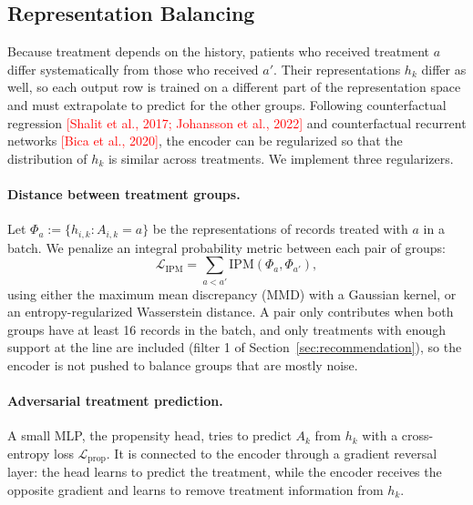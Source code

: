 \documentclass[a4paper,10pt]{article}
\newcommand{\todo}[1]{\textcolor{red}{#1}}
\begin{document}
\subsection{Representation Balancing}
\label{sec:balancing}

Because treatment depends on the history, patients who received treatment $a$ differ systematically from those who received $a'$. Their representations $h_k$ differ as well, so each output row is trained on a different part of the representation space and must extrapolate to predict for the other groups. Following counterfactual regression \todo{[Shalit et al., 2017; Johansson et al., 2022]} and counterfactual recurrent networks \todo{[Bica et al., 2020]}, the encoder can be regularized so that the distribution of $h_k$ is similar across treatments. We implement three regularizers.

\paragraph{Distance between treatment groups.} Let $\Phi_a := \{h_{i,k} : A_{i,k} = a\}$ be the representations of records treated with $a$ in a batch. We penalize an integral probability metric between each pair of groups:
\begin{equation}
    \mathcal{L}_{\text{IPM}} = \sum_{a < a'} \text{IPM}(\Phi_a, \Phi_{a'}),
\end{equation}
using either the maximum mean discrepancy (MMD) with a Gaussian kernel, or an entropy-regularized Wasserstein distance. A pair only contributes when both groups have at least 16 records in the batch, and only treatments with enough support at the line are included (filter 1 of Section~\ref{sec:recommendation}), so the encoder is not pushed to balance groups that are mostly noise.

\paragraph{Adversarial treatment prediction.} A small MLP, the propensity head, tries to predict $A_k$ from $h_k$ with a cross-entropy loss $\mathcal{L}_{\text{prop}}$. It is connected to the encoder through a gradient reversal layer: the head learns to predict the treatment, while the encoder receives the opposite gradient and learns to remove treatment information from $h_k$.
\end{document}
